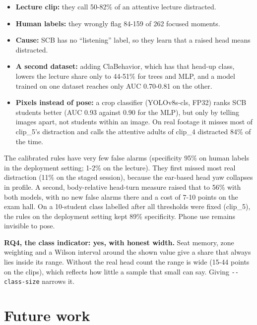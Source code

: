 \begin{itemize}
\tightlist
\item
  \textbf{Lecture clip:} they call 50-82\% of an attentive lecture distracted.
\item
  \textbf{Human labels:} they wrongly flag 84-159 of 262 focused moments.
\item
  \textbf{Cause:} SCB has no ``listening'' label, so they learn that a raised head means distracted.
\item
  \textbf{A second dataset:} adding ClaBehavior, which has that head-up class, lowers the lecture share only to 44-51\% for trees and MLP, and a model trained on one dataset reaches only AUC 0.70-0.81 on the other.
\item
  \textbf{Pixels instead of pose:} a crop classifier (YOLOv8s-cls, FP32) ranks SCB students better (AUC 0.93 against 0.90 for the MLP), but only by telling images apart, not students within an image. On real footage it misses most of clip\_5's distraction and calls the attentive adults of clip\_4 distracted 84\% of the time.
\end{itemize}

The calibrated rules have very few false alarms (specificity 95\% on human labels in the deployment setting; 1-2\% on the lecture). They first missed most real distraction (11\% on the staged session), because the ear-based head yaw collapses in profile. A second, body-relative head-turn measure raised that to 56\% with both models, with no new false alarms there and a cost of 7-10 points on the exam hall. On a 10-student class labelled after all thresholds were fixed (clip\_5), the rules on the deployment setting kept 89\% specificity. Phone use remains invisible to pose.

\textbf{RQ4, the class indicator: yes, with honest width.} Seat memory, zone weighting and a Wilson interval around the shown value give a share that always lies inside its range. Without the real head count the range is wide (15-44 points on the clips), which reflects how little a sample that small can say. Giving \texttt{-\/-class-size} narrows it.

\section{Future work}

